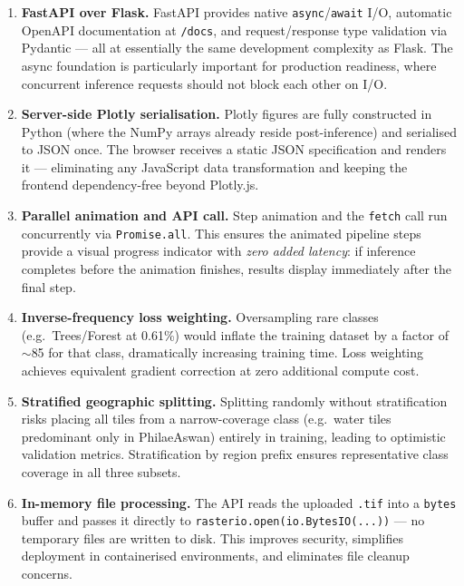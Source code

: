 \documentclass[12pt, a4paper]{article}
\newcommand{\tif}{\texttt{.tif}}
\begin{document}
\begin{enumerate}[leftmargin=*, label=\textbf{\arabic*.}, itemsep=6pt]
  \item \textbf{FastAPI over Flask.}
    FastAPI provides native \texttt{async}/\texttt{await} I/O, automatic OpenAPI documentation at \texttt{/docs}, and request/response type validation via Pydantic — all at essentially the same development complexity as Flask. The async foundation is particularly important for production readiness, where concurrent inference requests should not block each other on I/O.

  \item \textbf{Server-side Plotly serialisation.}
    Plotly figures are fully constructed in Python (where the NumPy arrays already reside post-inference) and serialised to JSON once. The browser receives a static JSON specification and renders it — eliminating any JavaScript data transformation and keeping the frontend dependency-free beyond Plotly.js.

  \item \textbf{Parallel animation and API call.}
    Step animation and the \texttt{fetch} call run concurrently via \texttt{Promise.all}. This ensures the animated pipeline steps provide a visual progress indicator with \textit{zero added latency}: if inference completes before the animation finishes, results display immediately after the final step.

  \item \textbf{Inverse-frequency loss weighting.}
    Oversampling rare classes (e.g.\ Trees/Forest at 0.61\%) would inflate the training dataset by a factor of $\sim$85 for that class, dramatically increasing training time. Loss weighting achieves equivalent gradient correction at zero additional compute cost.

  \item \textbf{Stratified geographic splitting.}
    Splitting randomly without stratification risks placing all tiles from a narrow-coverage class (e.g.\ water tiles predominant only in PhilaeAswan) entirely in training, leading to optimistic validation metrics. Stratification by region prefix ensures representative class coverage in all three subsets.

  \item \textbf{In-memory file processing.}
    The API reads the uploaded \tif{} into a \texttt{bytes} buffer and passes it directly to \texttt{rasterio.open(io.BytesIO(...))} — no temporary files are written to disk. This improves security, simplifies deployment in containerised environments, and eliminates file cleanup concerns.
\end{enumerate}
\end{document}
